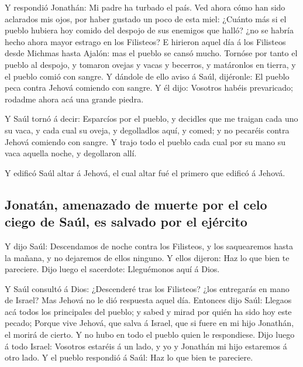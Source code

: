  Y respondió Jonathán: Mi padre ha turbado el país. Ved
ahora cómo han sido aclarados mis ojos, por haber gustado un poco de
esta miel:  ¿Cuánto más si el pueblo hubiera hoy comido
del despojo de sus enemigos que halló? ¿no se habría hecho ahora mayor
estrago en los Filisteos?  E hirieron aquel día á los
Filisteos desde Michmas hasta Ajalón: mas el pueblo se cansó mucho.
 Tornóse por tanto el pueblo al despojo, y tomaron ovejas
y vacas y becerros, y matáronlos en tierra, y el pueblo comió con
sangre.  Y dándole de ello aviso á Saúl, dijéronle: El
pueblo peca contra Jehová comiendo con sangre. Y él dijo: Vosotros
habéis prevaricado; rodadme ahora acá una grande piedra.

 Y Saúl tornó á decir: Esparcíos por el pueblo, y
decidles que me traigan cada uno su vaca, y cada cual su oveja, y
degolladlos aquí, y comed; y no pecaréis contra Jehová comiendo con
sangre. Y trajo todo el pueblo cada cual por su mano su vaca aquella
noche, y degollaron allí.

 Y edificó Saúl altar á Jehová, el cual altar fué el
primero que edificó á Jehová.

\hypertarget{jonatuxe1n-amenazado-de-muerte-por-el-celo-ciego-de-sauxfal-es-salvado-por-el-ejuxe9rcito}{%
\subsection{Jonatán, amenazado de muerte por el celo ciego de Saúl, es
salvado por el
ejército}\label{jonatuxe1n-amenazado-de-muerte-por-el-celo-ciego-de-sauxfal-es-salvado-por-el-ejuxe9rcito}}

 Y dijo Saúl: Descendamos de noche contra los Filisteos,
y los saquearemos hasta la mañana, y no dejaremos de ellos ninguno. Y
ellos dijeron: Haz lo que bien te pareciere. Dijo luego el sacerdote:
Lleguémonos aquí á Dios.

 Y Saúl consultó á Dios: ¿Descenderé tras los Filisteos?
¿los entregarás en mano de Israel? Mas Jehová no le dió respuesta aquel
día.  Entonces dijo Saúl: Llegaos acá todos los
principales del pueblo; y sabed y mirad por quién ha sido hoy este
pecado;  Porque vive Jehová, que salva á Israel, que si
fuere en mi hijo Jonathán, el morirá de cierto. Y no hubo en todo el
pueblo quien le respondiese.  Dijo luego á todo Israel:
Vosotros estaréis á un lado, y yo y Jonathán mi hijo estaremos á otro
lado. Y el pueblo respondió á Saúl: Haz lo que bien te pareciere.

